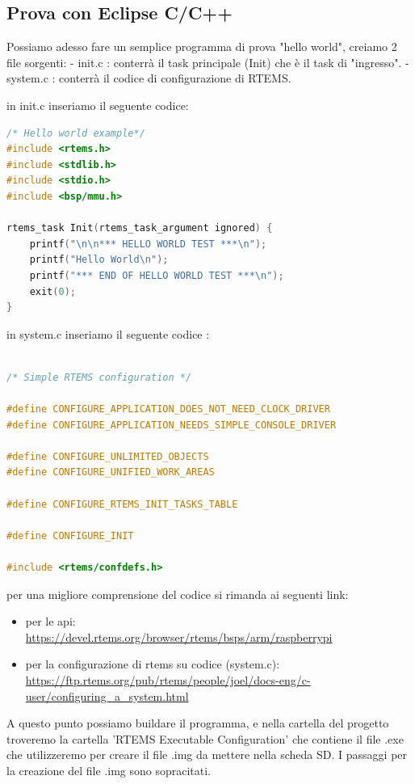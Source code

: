 \documentclass[12pt, a4paper]{article}
\begin{document}
\begin{flushleft}
\newpage
\section{Prova con Eclipse C/C++}

Possiamo adesso fare un semplice programma di prova "hello world",
creiamo 2 file sorgenti:
- init.c : conterrà il task principale (Init) che è il task di "ingresso".
- system.c : conterrà il codice di configurazione di RTEMS.

in init.c inseriamo il seguente codice:
\begin{lstlisting}[language=c] 
/* Hello world example*/
#include <rtems.h>
#include <stdlib.h>
#include <stdio.h>
#include <bsp/mmu.h>

rtems_task Init(rtems_task_argument ignored) {
	printf("\n\n*** HELLO WORLD TEST ***\n");
	printf("Hello World\n");
	printf("*** END OF HELLO WORLD TEST ***\n");
	exit(0);
}


\end{lstlisting}
in system.c inseriamo il seguente codice :

\begin{lstlisting}[language=c] 

/* Simple RTEMS configuration */

#define CONFIGURE_APPLICATION_DOES_NOT_NEED_CLOCK_DRIVER
#define CONFIGURE_APPLICATION_NEEDS_SIMPLE_CONSOLE_DRIVER

#define CONFIGURE_UNLIMITED_OBJECTS
#define CONFIGURE_UNIFIED_WORK_AREAS

#define CONFIGURE_RTEMS_INIT_TASKS_TABLE

#define CONFIGURE_INIT

#include <rtems/confdefs.h>

\end{lstlisting}

per una migliore comprensione del codice si rimanda ai seguenti link:
\begin{itemize}
\item per le api: \\ \url{https://devel.rtems.org/browser/rtems/bsps/arm/raspberrypi}
\item per la configurazione di rtems su codice (system.c):\\  \url{https://ftp.rtems.org/pub/rtems/people/joel/docs-eng/c-user/configuring_a_system.html}
\end{itemize}

A questo punto possiamo buildare il programma, e nella cartella del progetto troveremo la cartella 'RTEMS Executable Configuration' che contiene il file .exe che utilizzeremo per creare il file .img da mettere nella scheda SD.
I passaggi per la creazione del file .img sono sopracitati.


\end{flushleft}
\end{document}
